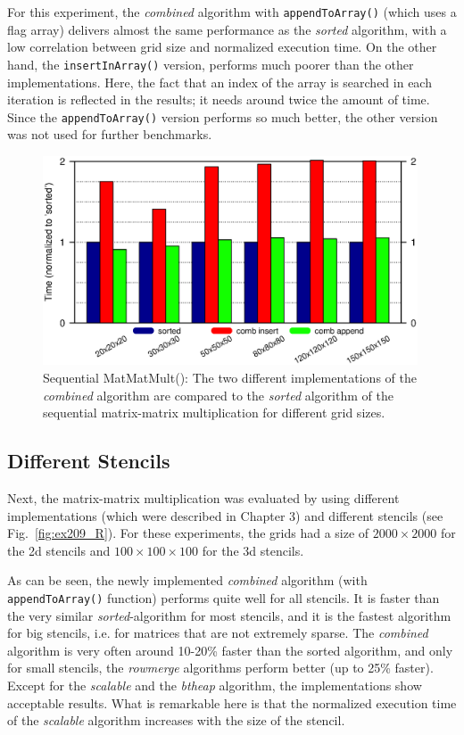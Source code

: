 For this experiment, the \textit{combined} algorithm with \texttt{appendToArray()} (which uses a flag array) delivers almost the same performance as the \textit{sorted} algorithm, with a low correlation between grid size and normalized execution time. On the other hand, the \texttt{insertInArray()} version, performs much poorer than the other implementations. Here, the fact that an index of the array is searched in each iteration is reflected in the results; it needs around twice the amount of time. Since the \texttt{appendToArray()} version performs so much better, the other version was not used for further benchmarks.

\begin{figure}[tb]
	\centering
	\includegraphics[width=0.99\textwidth, trim={0 2.cm 0 7cm},clip]{seq_insert_append}
	\caption{Sequential MatMatMult(): The two different implementations of the \textit{combined} algorithm are compared to the \textit{sorted} algorithm of the sequential matrix-matrix multiplication for different grid sizes.} 
	\label{fig:ex209_insert_append_3d19p}
\end{figure}

\subsection{Different Stencils}
Next, the matrix-matrix multiplication was evaluated by using different implementations (which were described in Chapter 3) and different stencils (see Fig.~\ref{fig:ex209_R}). For these experiments, the grids had a size of $2000 \times 2000$ for the 2d stencils and $100\times 100 \times 100$ for the 3d stencils. 

As can be seen, the newly implemented \textit{combined} algorithm (with \texttt{appendToArray()} function) performs quite well for all stencils. It is faster than the very similar \textit{sorted}-algorithm for most stencils, and it is the fastest algorithm for big stencils, i.e. for matrices that are not extremely sparse. The \textit{combined} algorithm is very often around 10-20\% faster than the sorted algorithm, and only for small stencils, the \textit{rowmerge} algorithms perform better (up to 25\% faster). Except for the \textit{scalable} and the \textit{btheap} algorithm, the implementations show acceptable results. What is remarkable here is that the normalized execution time of the \textit{scalable} algorithm increases with the size of the stencil.%

